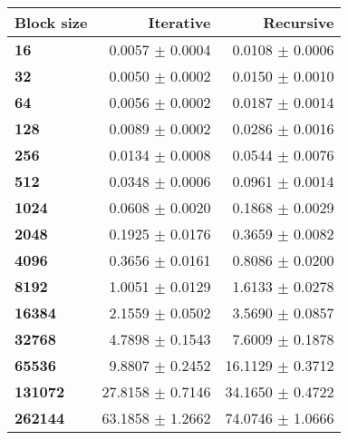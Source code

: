 \begin{tabular}{lrr}\toprule
\textbf{Block size}  & \textbf{Iterative} & \textbf{Recursive}\\\midrule
\textbf{16}  & 0.0057 $\pm$ 0.0004 & 0.0108 $\pm$ 0.0006\\
\textbf{32}  & 0.0050 $\pm$ 0.0002 & 0.0150 $\pm$ 0.0010\\
\textbf{64}  & 0.0056 $\pm$ 0.0002 & 0.0187 $\pm$ 0.0014\\
\textbf{128}  & 0.0089 $\pm$ 0.0002 & 0.0286 $\pm$ 0.0016\\
\textbf{256}  & 0.0134 $\pm$ 0.0008 & 0.0544 $\pm$ 0.0076\\
\textbf{512}  & 0.0348 $\pm$ 0.0006 & 0.0961 $\pm$ 0.0014\\
\textbf{1024}  & 0.0608 $\pm$ 0.0020 & 0.1868 $\pm$ 0.0029\\
\textbf{2048}  & 0.1925 $\pm$ 0.0176 & 0.3659 $\pm$ 0.0082\\
\textbf{4096}  & 0.3656 $\pm$ 0.0161 & 0.8086 $\pm$ 0.0200\\
\textbf{8192}  & 1.0051 $\pm$ 0.0129 & 1.6133 $\pm$ 0.0278\\
\textbf{16384}  & 2.1559 $\pm$ 0.0502 & 3.5690 $\pm$ 0.0857\\
\textbf{32768}  & 4.7898 $\pm$ 0.1543 & 7.6009 $\pm$ 0.1878\\
\textbf{65536}  & 9.8807 $\pm$ 0.2452 & 16.1129 $\pm$ 0.3712\\
\textbf{131072}  & 27.8158 $\pm$ 0.7146 & 34.1650 $\pm$ 0.4722\\
\textbf{262144} & 63.1858 $\pm$ 1.2662 & 74.0746 $\pm$ 1.0666\\
\bottomrule
\end{tabular}
